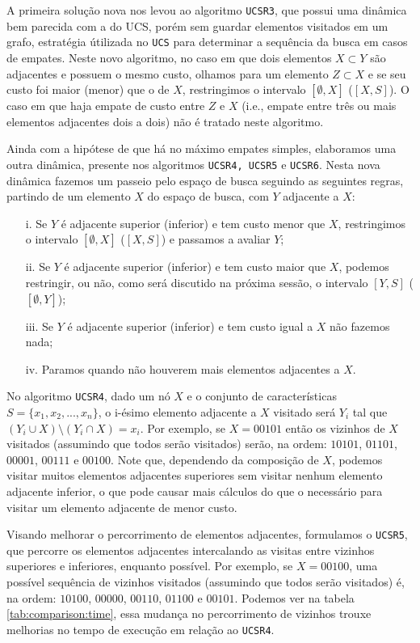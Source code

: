 \documentclass[12pt]{article}
\begin{document}
A primeira solução nova nos levou ao algoritmo {\tt UCSR3}, que possui uma dinâmica bem parecida com a do UCS, porém sem guardar elementos visitados em um grafo, estratégia útilizada no {\tt UCS} para determinar a sequência da busca em casos de empates. Neste novo algoritmo, no caso em que dois elementos $X \subset Y$ são adjacentes e possuem o mesmo custo, olhamos para um elemento $Z \subset X$ e se seu custo foi maior (menor) que o de $X$, restringimos o intervalo $[\emptyset, X]$ ($[X, S]$). O caso em que haja empate de custo entre $Z$ e $X$ (i.e., empate entre três ou mais elementos adjacentes dois a dois) não é tratado neste algoritmo.

Ainda com a hipótese de que há no máximo empates simples, elaboramos uma outra dinâmica, presente nos algoritmos {\tt UCSR4, UCSR5} e {\tt UCSR6}. Nesta nova dinâmica fazemos um passeio pelo espaço de busca seguindo as seguintes regras, partindo de um elemento $X$ do espaço de busca, com $Y$ adjacente a $X$:
\begin{itemize}
\item[i.] Se $Y$ é adjacente superior (inferior) e tem custo menor que $X$, restringimos o intervalo $[\emptyset, X]$ ($[X, S]$) e passamos a avaliar $Y$;
\item[ii.] Se $Y$ é adjacente superior (inferior) e tem custo maior que $X$, podemos restringir, ou não, como será discutido na próxima sessão, o intervalo $[Y, S]$ ($[\emptyset, Y]$);
\item[iii.] Se $Y$ é adjacente superior (inferior) e tem custo igual a $X$ não fazemos nada;
\item[iv.] Paramos quando não houverem mais elementos adjacentes a $X$.
\end{itemize}

No algoritmo {\tt UCSR4}, dado um nó $X$ e o conjunto de características $S = \{x_1, x_2, ..., x_n\}$, o i-ésimo elemento adjacente a $X$ visitado será $Y_i$ tal que $(Y_i \cup X) \setminus (Y_i \cap X) = {x_i}$. Por exemplo, se $X = 00101$ então os vizinhos de $X$ visitados (assumindo que todos serão visitados) serão, na ordem: $10101$, $01101$, $00001$, $00111$ e $00100$. Note que, dependendo da composição de $X$, podemos visitar muitos elementos adjacentes superiores sem visitar nenhum elemento adjacente inferior, o que pode causar mais cálculos do que o necessário para visitar um elemento adjacente de menor custo.

Visando melhorar o percorrimento de elementos adjacentes, formulamos o {\tt UCSR5}, que percorre os elementos adjacentes intercalando as visitas entre vizinhos superiores e inferiores, enquanto possível. Por exemplo, se $X = 00100$, uma possível sequência de vizinhos visitados (assumindo que todos serão visitados) é, na ordem: $10100$, $00000$, $00110$, $01100$ e $00101$. Podemos ver na tabela \ref{tab:comparison:time}, essa mudança no percorrimento de vizinhos trouxe melhorias no tempo de execução em relação ao {\tt UCSR4}.
\end{document}

